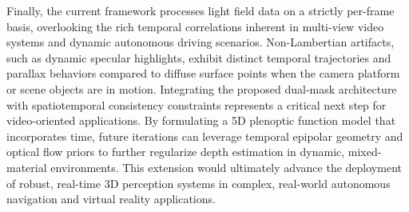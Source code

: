 Finally, the current framework processes light field data on a strictly per-frame basis, overlooking the rich temporal correlations inherent in multi-view video systems and dynamic autonomous driving scenarios. Non-Lambertian artifacts, such as dynamic specular highlights, exhibit distinct temporal trajectories and parallax behaviors compared to diffuse surface points when the camera platform or scene objects are in motion. Integrating the proposed dual-mask architecture with spatiotemporal consistency constraints represents a critical next step for video-oriented applications. By formulating a 5D plenoptic function model that incorporates time, future iterations can leverage temporal epipolar geometry and optical flow priors to further regularize depth estimation in dynamic, mixed-material environments. This extension would ultimately advance the deployment of robust, real-time 3D perception systems in complex, real-world autonomous navigation and virtual reality applications.